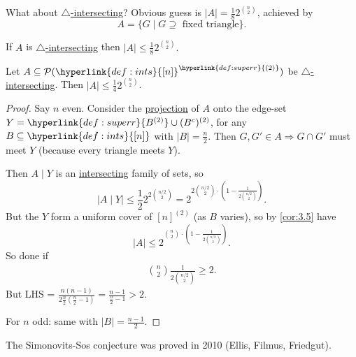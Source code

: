 \documentclass{article}
\let\subset\subseteq
\begin{document}
What about \hyperlink{def:hinter}{$\triangle$-intersecting}? Obvious guess is $|A| = \frac{1}{8} 2^{\binom n 2}$, achieved by
\begin{equation*}A = \{G \mid G \supseteq \text{ fixed triangle}\}.\end{equation*}
\begin{conjecture}
  If $A$ is \hyperlink{def:hinter}{$\triangle$-intersecting} then $|A| \leq \frac{1}{8} 2^{\binom{n}{2}}.$
\end{conjecture}
\begin{nthm}\label{thm:3.8}
  Let $A \subset \mathcal{P}(\hyperlink{def:ints}{[n]}^{\hyperlink{def:superr}{(2)}})$ be \hyperlink{def:hinter}{$\triangle$-intersecting}.
  Then $|A| \leq \frac{1}{4} 2^{\binom n 2}$.
\end{nthm}
\begin{proof}
  Say $n$ even.
  Consider the \hyperlink{def:proj}{projection} of $A$ onto the edge-set $Y = \hyperlink{def:superr}{B^{(2)}} \cup (B^c)^{(2)}$, for any $B \subset \hyperlink{def:ints}{[n]}$ with $|B| = \frac{n}{2}$.
  Then $G, G' \in A \Rightarrow G \cap G'$ must meet $Y$ (because every triangle meets $Y$).
  \begin{center}
  \end{center}
  Then \hyperlink{def:proj}{$A \mid Y$} is an \hyperlink{def:inter}{intersecting} family of sets, so
  \begin{equation*}
    |A \mid Y| \leq \frac{1}{2} 2^{2 \binom{n/2}{2}} = 2^{2 \binom{n/2}{2} \cdot \left(1 - \frac{1}{2 \binom{n/2}{2}}\right)}.
  \end{equation*}
  But the $Y$ form a uniform cover of $[n]^{(2)}$ (as $B$ varies), so by \cref{cor:3.5} have
  \begin{equation*}
    |A| \leq 2^{\binom{n}{2} \cdot \left(1 - \frac{1}{2 \binom{n/2}{2}}\right)}.
  \end{equation*}
  So done if
  \begin{align*}
    \binom{n}{2} \frac{1}{2 \binom{n/2}{2}} \geq 2.
  \end{align*}
  But LHS = $\frac{n(n-1)}{2 \frac{n}{2} (\frac{n}{2}-1)} = \frac{n-1}{\frac{n}{2}-1} > 2$.

  For $n$ odd: same with $|B| = \frac{n-1}{2}$.
\end{proof}
The Simonovits-Sos conjecture was proved in 2010 (Ellis, Filmus, Friedgut).
\end{document}
